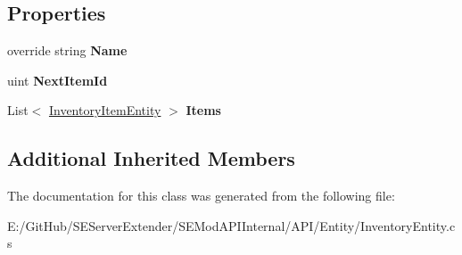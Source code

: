 \subsection*{Properties}
\begin{DoxyCompactItemize}
\item 
\hypertarget{class_s_e_mod_a_p_i_internal_1_1_a_p_i_1_1_entity_1_1_inventory_entity_a271cb654e7aaf57edd0f4b48eadacbfe}{}override string {\bfseries Name}\label{class_s_e_mod_a_p_i_internal_1_1_a_p_i_1_1_entity_1_1_inventory_entity_a271cb654e7aaf57edd0f4b48eadacbfe}

\item 
\hypertarget{class_s_e_mod_a_p_i_internal_1_1_a_p_i_1_1_entity_1_1_inventory_entity_abcd9deedc1a1f188301e5c2f91009b83}{}uint {\bfseries Next\+Item\+Id}\label{class_s_e_mod_a_p_i_internal_1_1_a_p_i_1_1_entity_1_1_inventory_entity_abcd9deedc1a1f188301e5c2f91009b83}

\item 
\hypertarget{class_s_e_mod_a_p_i_internal_1_1_a_p_i_1_1_entity_1_1_inventory_entity_a991d83431f9c3ef8a9deaa0088798546}{}List$<$ \hyperlink{class_s_e_mod_a_p_i_internal_1_1_a_p_i_1_1_entity_1_1_inventory_item_entity}{Inventory\+Item\+Entity} $>$ {\bfseries Items}\label{class_s_e_mod_a_p_i_internal_1_1_a_p_i_1_1_entity_1_1_inventory_entity_a991d83431f9c3ef8a9deaa0088798546}

\end{DoxyCompactItemize}
\subsection*{Additional Inherited Members}


The documentation for this class was generated from the following file\+:\begin{DoxyCompactItemize}
\item 
E\+:/\+Git\+Hub/\+S\+E\+Server\+Extender/\+S\+E\+Mod\+A\+P\+I\+Internal/\+A\+P\+I/\+Entity/Inventory\+Entity.\+cs\end{DoxyCompactItemize}
